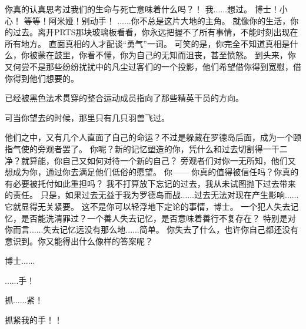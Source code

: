 \documentclass[openany]{book}
\begin{document}
\begin{dialogue}
     你真的认真思考过我们的生命与死亡意味着什么吗？！
     我......想过。
     博士！小心！
     等等！阿米娅！别动手！
     ......你不总是这片大地的主角。
     就像你的生活，你的过去。离开PRTS那块玻璃板看看，你永远把握不了所有事情，不能时刻出现在所有地方。
     直面真相的人才配谈“勇气”一词。
     可笑的是，你完全不知道真相是什么，你被蒙在鼓里，你看不懂，你为自己的无知而沮丧，甚至愤怒。
     到头来，你又何尝不是那些纷纷扰扰中的凡尘过客们的一个投影，他们希望借你得到宽慰，借你得到他们想要的。\par
    已经被黑色法术贯穿的整合运动成员指向了那些精英干员的方向。\par
    可当你望去的时候，那里只有几只羽兽飞过。\par
     他们之中，又有几个人直面了自己的命运？不过是躲藏在罗德岛后面，成为一个颐指气使的旁观者罢了。
     你呢？新的记忆塑造的你，凭什么和过去切割得一干二净？就算能，你自己又如何对待一个新的自己？
     旁观者们对你一无所知，他们又想成为你，通过你去满足他们低俗的愿望。
     你——
     你真的值得被信任吗？你真的有必要被托付如此重担吗？
     我不打算放下忘记的过去，我从未试图抛下过去带来的责任。
     只是，如果过去无益于我为罗德岛而战......过去无法对现在产生影响......
     它就显得无关紧要。
     这不是你可以轻浮地下定论的事情，博士。
     一个犯人失去记忆，是否能洗清罪过？一个善人失去记忆，是否意味着善行不复存在？
     特别是对你而言......失去记忆远没有那么地......简单。
     你失去了什么，也许你自己都还没有意识到。你又能得出什么像样的答案呢？
\end{dialogue}\par

博士......\par
......手！\par
抓......紧！\par
抓紧我的手！！
\end{document}
